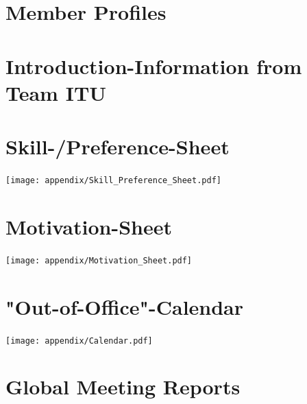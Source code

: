 \section{Member Profiles} 
\label{sec:member_profiles}








\section{Introduction-Information from Team ITU} 
\label{sec:summaryITU}


\section{Skill-/Preference-Sheet} \label{sec:Skill_Preference_Sheet}
\texttt{[image: appendix/Skill\_Preference\_Sheet.pdf]}

\section{Motivation-Sheet} 
\label{sec:Motivation_Sheet}
\texttt{[image: appendix/Motivation\_Sheet.pdf]}

\section{"Out-of-Office"-Calendar} 
\label{sec:Calendar}
\texttt{[image: appendix/Calendar.pdf]}

\section{Global Meeting Reports}
\label{sec:meeting_reports}








